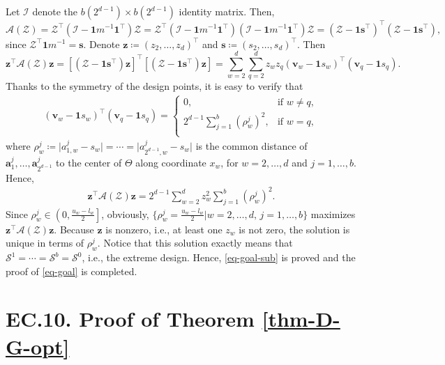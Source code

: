 \documentclass[ijoc,nonblindrev]{informs3}
\def\cI{{\mathcal I}}
\def\cZ{{\mathcal Z}}
\def\cS{{\mathcal{S}}}
\def\cA{{\mathcal A}}
\def\ba{{\bm a}}
\def\bv{{\bm v}}
\def\bz{{\bm z}}
\def\bs{{\bm s}}
\def\bone{{\bm 1}}
\begin{document}
Let $\cI$ denote the $b(2^{d-1}) \times b(2^{d-1})$ identity matrix. Then,
\[
\cA(\cZ) = \cZ^\intercal \left(\cI - \bone m^{-1} \bone^\intercal \right) \cZ
= \cZ^\intercal \left(\cI - \bone m^{-1} \bone^\intercal \right) \left(\cI - \bone m^{-1} \bone^\intercal \right) \cZ
= \left(\cZ - \bone \bs^\intercal\right)^\intercal \left(\cZ - \bone \bs^\intercal\right),
\]
since $\cZ^\intercal \bone m^{-1} = \bs$.
Denote $\bz \coloneqq (z_2,\ldots,z_d)^\intercal$ and $\bs \coloneqq (s_2,\ldots,s_d)^\intercal$.
Then
\[
\bz^\intercal \cA(\cZ)\bz = \left[ \left(\cZ - \bone \bs^\intercal \right) \bz \right]^\intercal \left[ \left(\cZ - \bone \bs^\intercal \right) \bz \right]
= \sum_{w=2}^d \sum_{q=2}^d z_w z_q (\bv_w-\bone s_w)^\intercal (\bv_q-\bone s_q).
\]
Thanks to the symmetry of the design points, it is easy to verify that
\begin{align*}
(\bv_w-\bone s_w)^\intercal (\bv_q-\bone s_q) =
\begin{cases}
0, & \text{if $w\neq q$},\\[0.4em]
2^{d-1} \sum_{j=1}^b (\rho_w^j)^2, & \text{if $w = q$},\\
\end{cases}
\end{align*}
where $\rho_w^j \coloneqq \big| a_{1,w}^j - s_w \big| = \cdots = \big| a_{2^{d-1},w}^j - s_w \big|$ is the common distance of $\ba_1^j,\ldots,\ba_{2^{d-1}}^j$ to the center of $\Theta$ along coordinate $x_w$,
for $w=2,\ldots,d$ and $j=1,\ldots,b$.
Hence,
\begin{align*}
\bz^\intercal \cA(\cZ)\bz = 2^{d-1} \sum_{w=2}^d z_w^2 \sum_{j=1}^b (\rho_w^j)^2 .
\end{align*}
Since $\rho_w^j \in \left(0,\frac{u_w-l_w}{2} \right]$,
obviously, $\{\rho_w^j = \frac{u_w-l_w}{2}|w=2,\ldots,d,\, j=1,\ldots,b\}$ maximizes $\bz^\intercal \cA(\cZ)\bz$.
Because $\bz$ is nonzero, i.e., at least one $z_w$ is not zero, the solution is unique in terms of $\rho_w^j$.
Notice that this solution exactly means that $\cS^1=\cdots =\cS^b = \cS^0$, i.e., the extreme design.
Hence, \eqref{eq-goal-sub} is proved and the proof of \eqref{eq-goal} is completed.
\Halmos
\endproof

\hypertarget{EC.10}{
\section*{EC.10. \hspace{5pt} Proof of Theorem \ref{thm-D-G-opt}}
}
\end{document}
